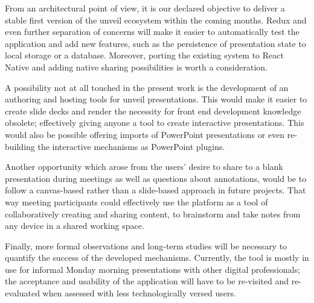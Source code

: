 From an architectural point of view, it is our declared objective to deliver a stable first version of the unveil ecosystem within the coming months. Redux and even further separation of concerns will make it easier to automatically test the application and add new features, such as the persistence of presentation state to local storage or a database. Moreover, porting the existing system to React Native and adding native sharing possibilities is worth a consideration.

A possibility not at all touched in the present work is the development of an authoring and hosting tools for unveil presentations. This would make it easier to create slide decks and render the necessity for front end development knowledge obsolete; effectively giving anyone a tool to create interactive presentations. This would also be possible offering imports of PowerPoint presentations or even re-building the interactive mechanisms as PowerPoint plugins.

Another opportunity which arose from the users' desire to share to a blank presentation during meetings as well as questions about annotations, would be to follow a canvas-based rather than a slide-based approach in future projects. That way meeting participants could effectively use the platform as a tool of collaboratively creating and sharing content, to brainstorm and take notes from any device in a shared working space.

Finally, more formal observations and long-term studies will be necessary to quantify the success of the developed mechanisms. Currently, the tool is mostly in use for informal Monday morning presentations with other digital professionals; the acceptance and usability of the application will have to be re-visited and re-evaluated when assessed with less technologically versed users.